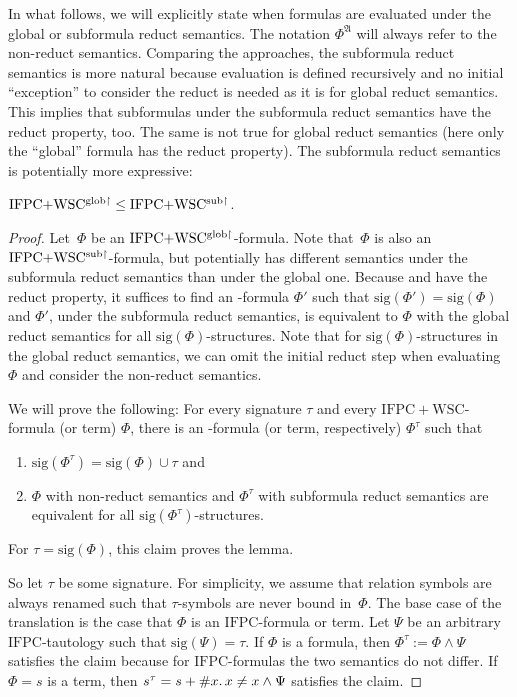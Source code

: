 \documentclass[]{lmcs}
\newcommand{\qspace}{\mathchoice{\;}{\,}{}{}}
\newcommand{\termA}{s}
\newcommand{\formA}{\Phi}
\newcommand{\formB}{\Psi}
\newcommand{\StructA}{\mathfrak{A}}
\newcommand{\sigA}{\tau}
\newcommand{\sigOf}[1]{\mathrm{sig}(#1)}
\newcommand{\IFPC}{\ensuremath{\mathrm{IFPC}}}
\newcommand{\IFPCWSC}{\ensuremath{\mathrm{IFPC{+}WSC}}}
\begin{document}
In what follows, we will explicitly state when formulas are evaluated under the global or subformula reduct semantics.
The notation $\formA^\StructA$ will always refer to the non-reduct semantics.
Comparing the approaches, the subformula reduct semantics
is more natural because evaluation is defined recursively
and no initial ``exception'' to consider the reduct is needed
as it is for global reduct semantics.
This implies that subformulas under the subformula reduct semantics have the reduct property, too.
The same is not true for global reduct semantics (here only the ``global'' formula has the reduct property).
The subformula reduct semantics is potentially more expressive:
\begin{lem}
	$ \mathrm{IFPC{+}WSC^{\mathrm{glob}\upharpoonright}} {} \leq  \mathrm{IFPC{+}WSC^{\mathrm{sub}\upharpoonright}} {}$.
\end{lem}
\begin{proof}
	Let~$\formA$ be an $ \mathrm{IFPC{+}WSC^{\mathrm{glob}\upharpoonright}} {}$-formula.
	Note that~$\formA$ is also an $ \mathrm{IFPC{+}WSC^{\mathrm{sub}\upharpoonright}} {}$-formula,
	but potentially has different semantics under the subformula reduct semantics than under the global one.
	Because \IFPCWSCglob{} and \IFPCWSCsub{}
	have the reduct property,
	it suffices to find an  \IFPCWSCsub{}-formula $\formA'$ such that $\sigOf{\formA'} = \sigOf{\formA}$ and $\formA'$, under the subformula reduct semantics, is equivalent to $\formA$ with the global reduct semantics for all $\sigOf{\formA}$-structures.
	Note that for $\sigOf{\formA}$-structures in the global reduct semantics, we can omit the initial reduct step when evaluating $\formA$
	and consider the non-reduct semantics.

	We will prove the following:
	For every signature $\sigA$
	and every \IFPCWSC{}-formula (or term) $\formA$, there is an \IFPCWSCsub{}-formula (or term, respectively) $\formA^\sigA$ such that
	\begin{enumerate}
		\item $\sigOf{\formA^\sigA} = \sigOf{\formA} \cup \sigA$
		and
		\item $\formA$ with non-reduct semantics and $\formA^\sigA$ with subformula reduct semantics are equivalent for all $\sigOf{\formA^\sigA}$-structures.
	\end{enumerate}
	For $\sigA = \sigOf{\formA}$, this claim proves the lemma.
	
	So let $\sigA$ be some signature.
	For simplicity, we assume that relation symbols are always renamed such that $\sigA$-symbols are never bound in~$\formA$.
	The base case of the translation is the case that $\formA$ is an $\IFPC{}$-formula or term.
	Let $\formB$ be an arbitrary \IFPC{}-tautology such that $\sigOf{\formB} = \sigA$.
	If $\formA$ is a formula, then $\formA^\sigA := \formA \land \formB$ satisfies the claim
	because for \IFPC{}-formulas the two semantics do not differ.
	If $\formA = \termA$ is a term, then $\termA^\sigA = \termA + \# x.\qspace x \neq x \land \formB$ satisfies the claim.
	

\end{proof}
\end{document}

